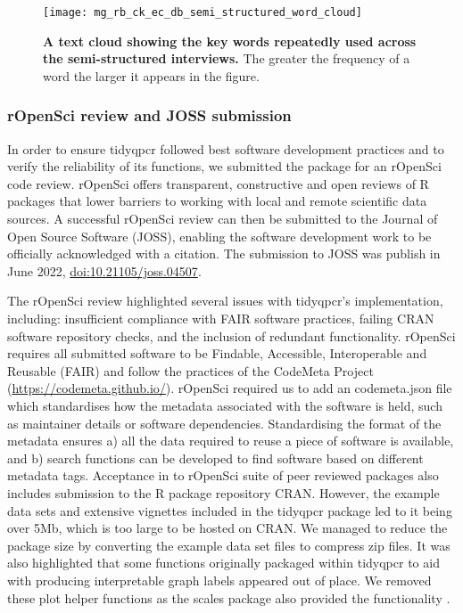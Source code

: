 \documentclass[../main.tex]{subfiles}
\begin{document}
\begin{figure}[t]

{\centering \texttt{[image: mg\_rb\_ck\_ec\_db\_semi\_structured\_word\_cloud]} 

}

\caption[A text cloud showing the key words repeatedly used across the semi-structured interviews.]{\textbf{A text cloud showing the key words repeatedly used across the semi-structured interviews.} The greater the frequency of a word the larger it appears in the figure. }\label{fig:semi-structured-test-cloud}
\end{figure}

\subsubsection{rOpenSci review and JOSS submission}
In order to ensure tidyqpcr followed best software development practices and to verify the reliability of its functions, we submitted the package for an rOpenSci code review. 
rOpenSci offers transparent, constructive and open reviews of R packages that lower barriers to working with local and remote scientific data sources.
A successful rOpenSci review can then be submitted to the Journal of Open Source Software (JOSS), enabling the software development work to be officially acknowledged with a citation.
The submission to JOSS was publish in June 2022, \href{https://joss.theoj.org/papers/10.21105/joss.04507}{doi:10.21105/joss.04507}.

The rOpenSci review highlighted several issues with tidyqpcr's implementation, including: insufficient compliance with FAIR software practices, failing CRAN software repository checks, and the inclusion of redundant functionality. 
rOpenSci requires all submitted software to be Findable, Accessible, Interoperable and Reusable (FAIR) and follow the practices of the CodeMeta Project (\url{https://codemeta.github.io/}).
rOpenSci required us to add an codemeta.json file which standardises how the metadata associated with the software is held, such as maintainer details or software dependencies.
Standardising the format of the metadata ensures a) all the data required to reuse a piece of software is available, and b) search functions can be developed to find software based on different metadata tags.
Acceptance in to rOpenSci suite of peer reviewed packages also includes submission to the R package repository CRAN.
However, the example data sets and extensive vignettes included in the tidyqpcr package led to it being over 5Mb, which is too large to be hosted on CRAN.
We managed to reduce the package size by converting the example data set files to compress zip files.
It was also highlighted that some functions originally packaged within tidyqpcr to aid with producing interpretable graph labels appeared out of place.
We removed these plot helper functions as the scales package also provided the functionality \parencite{Wickham2022}.
\end{document}
